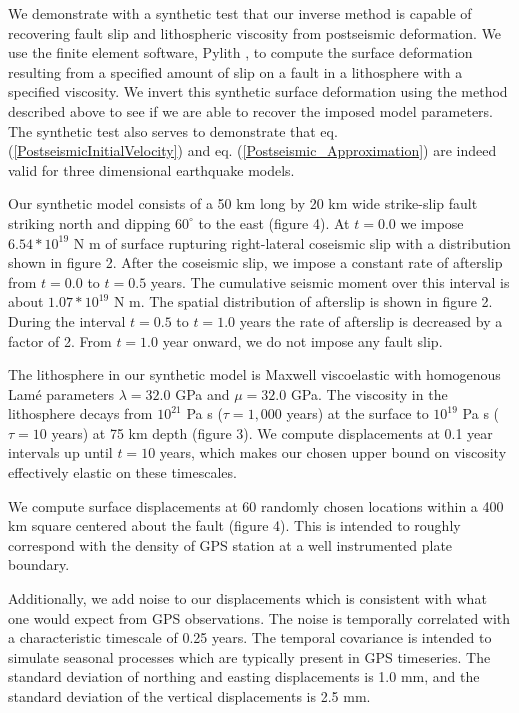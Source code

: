 \documentclass[extra]{gji}
\begin{document}
We demonstrate with a synthetic test that our inverse method is
capable of recovering fault slip and lithospheric viscosity from
postseismic deformation.  We use the finite element software, Pylith
\citep{A2007}, to compute the surface deformation resulting from a
specified amount of slip on a fault in a lithosphere with a specified
viscosity.  We invert this synthetic surface deformation using the
method described above to see if we are able to recover the imposed
model parameters.  The synthetic test also serves to demonstrate that
eq. (\ref{PostseismicInitialVelocity}) and
eq. (\ref{Postseismic_Approximation}) are indeed valid for three
dimensional earthquake models.

Our synthetic model consists of a 50 km long by 20 km wide strike-slip
fault striking north and dipping $60^{\circ}$ to the east (figure
4). At $t=0.0$ we impose $6.54*10^{19}$ N m of surface rupturing
right-lateral coseismic slip with a distribution shown in figure 2.
After the coseismic slip, we impose a constant rate of afterslip from
$t=0.0$ to $t=0.5$ years.  The cumulative seismic moment over this
interval is about $1.07*10^{19}$ N m.  The spatial distribution of
afterslip is shown in figure 2.  During the interval $t=0.5$ to
$t=1.0$ years the rate of afterslip is decreased by a factor of 2.
From $t=1.0$ year onward, we do not impose any fault slip.

The lithosphere in our synthetic model is Maxwell viscoelastic with
homogenous Lam\'e parameters $\lambda = 32.0$ GPa and $\mu = 32.0$
GPa.  The viscosity in the lithosphere decays from $10^{21}$ Pa s
($\tau=1,000$ years) at the surface to $10^{19}$ Pa s ($\tau=10$
years) at 75 km depth (figure 3).  We compute displacements at 0.1
year intervals up until $t=10$ years, which makes our chosen upper bound on
viscosity effectively elastic on these timescales.

We compute surface displacements at 60 randomly chosen locations
within a 400 km square centered about the fault (figure 4).  This is
intended to roughly correspond with the density of GPS station at a
well instrumented plate boundary.

Additionally, we add noise to our displacements which is consistent
with what one would expect from GPS observations.  The noise is
temporally correlated with a characteristic timescale of 0.25 years.
The temporal covariance is intended to simulate seasonal processes
which are typically present in GPS timeseries.  The standard deviation
of northing and easting displacements is 1.0 mm, and the standard
deviation of the vertical displacements is 2.5 mm.
\end{document}
